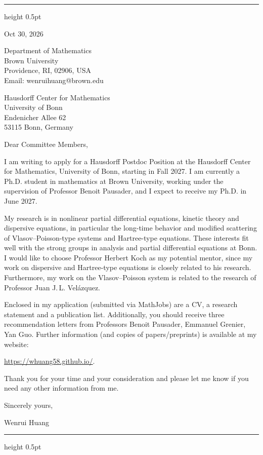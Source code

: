 \documentclass[10pt]{article}
\begin{document}
\vspace{0.08in}
\hrule height 0.5pt

\vspace{0.47in}
\hfill
\begin{minipage}{2.27in}
Oct 30, 2026

\vspace{0.16in}
Department of Mathematics\\
Brown University\\
Providence, RI, 02906, USA\\
Email: wenrui\textunderscore huang@brown.edu
\end{minipage}

\vspace{0.30in}
Hausdorff Center for Mathematics\\
University of Bonn\\
Endenicher Allee 62\\
53115 Bonn, Germany
 
\vspace{0.16in}
Dear Committee Members,
 
I am writing to apply for a Hausdorff Postdoc Position at the Hausdorff Center for Mathematics, University of Bonn, starting in Fall 2027. I am currently a Ph.D. student in mathematics at Brown University, working under the supervision of Professor Benoit Pausader, and I expect to receive my Ph.D. in June 2027.
 
My research is in nonlinear partial differential equations, kinetic theory and dispersive equations, in particular the long-time behavior and modified scattering of Vlasov--Poisson-type systems and Hartree-type equations. These interests fit well with the strong groups in analysis and partial differential equations at Bonn. I would like to choose Professor Herbert Koch as my potential mentor, since my work on dispersive and Hartree-type equations is closely related to his research. Furthermore, my work on the Vlasov--Poisson system is related to the research of Professor Juan J.\,L. Vel\'azquez.
 
Enclosed in my application (submitted via MathJobs) are a CV, a research statement and a publication list. Additionally, you should receive three recommendation letters from Professors Benoit Pausader, Emmanuel Grenier, Yan Guo. Further information (and copies of papers/preprints) is available at my website:

\url{https://whuang58.github.io/}.
 
 \medskip
Thank you for your time and your consideration and please let me know if you
need any other information from me.
 
\vspace{0.12in}
Sincerely yours,
 

Wenrui Huang
 
\vfill
\hrule height 0.5pt
 
\end{document}
